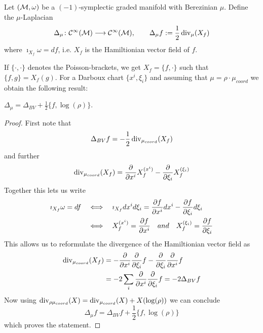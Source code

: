 \begin{definition}
  Let $(\mathcal{M}, \omega)$ be a $(-1)$-symplectic graded manifold with Berezinian $\mu$. Define the $\mu$-Laplacian
  \begin{equation}
    \Delta_\mu \colon \mathcal{C}^{\infty}(\mathcal{M}) \longrightarrow \mathcal{C}^{\infty}(\mathcal{M}), \quad \quad \Delta_\mu f := \frac{1}{2} \operatorname{div}_\mu(X_f)
  \end{equation}
  where $\imath_{X_f} \omega = df$, i.e. $X_f$ is the Hamiltionian vector field of $f$.
\end{definition}

If $\{\cdot, \cdot\}$ denotes the Poisson-brackets, we get $X_f = \{f, \cdot\}$ such that $\{f,g \} = X_f (g)$. For a Darboux chart $\{x^i, \xi_i\}$ and assuming that $\mu = \rho \cdot \mu_{coord}$ we obtain the following result:

\begin{lem}
  $\Delta_\mu = \Delta_{BV} + \frac{1}{2} \{f, \log(\rho)\}$.
\begin{proof}
  First note that
  \begin{equation}
    \Delta_{BV} f = - \frac{1}{2} \operatorname{div}_{\mu_{coord}}(X_f)
  \end{equation}
  and further
  \begin{equation}
    \operatorname{div}_{\mu_{coord}}(X_f) = \frac{\partial }{\partial x^i} X_f^{(x^i)} - \frac{\partial }{\partial \xi_i} X_f^{(\xi_i)}
  \end{equation}
  Together this lets us write
  \begin{align}
    \imath_{X_f} \omega = df \quad  &\Longleftrightarrow \quad  \imath_{X_f} dx^i d\xi_i = \frac{\partial f}{\partial x^i} dx^i - \frac{\partial f}{\partial \xi_i} d\xi_i \\
     \quad &\Longleftrightarrow \quad  X_f^{(x^i)} = \frac{\partial f}{\partial x^i} \quad and \quad X_f^{(\xi_i)} = \frac{\partial f}{\partial \xi_i}
  \end{align}
  This allows us to reformulate the divergence of the Hamiltionian vector field as
  \begin{align}
    \operatorname{div}_{\mu_{coord}}(X_f) &= - \frac{\partial }{\partial x^i} \frac{\partial }{\partial \xi_i} f - \frac{\partial }{\partial \xi_i} \frac{\partial }{\partial x^i} f \\
    &= - 2 \sum_i \frac{\partial }{\partial x^i} \frac{\partial }{\partial \xi_i} f = - 2 \Delta_{BV} f
  \end{align}
  Now using $\operatorname{div}_{\rho \mu_{coord}} (X) = \operatorname{div}_{\mu_{coord}} (X) + X(\log(\rho))$ we can conclude
  \begin{equation}
    \Delta_\mu f = \Delta_{BV} f + \frac{1}{2} \{ f, \log(\rho) \}
  \end{equation}
  which proves the statement.
\end{proof}
\end{lem}

